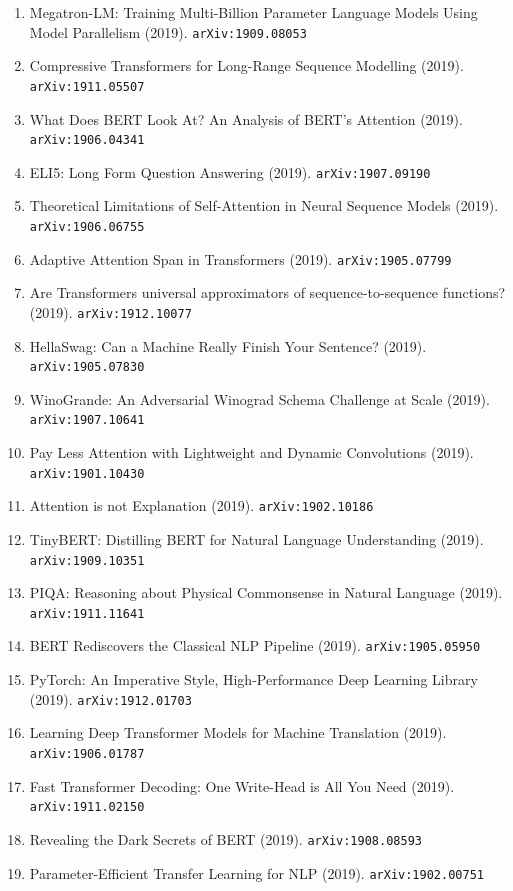 \documentclass[11pt]{article}
\begin{document}
\begin{enumerate}
  \item Megatron-LM: Training Multi-Billion Parameter Language Models Using
  Model Parallelism (2019). \texttt{arXiv:1909.08053}
  \item Compressive Transformers for Long-Range Sequence Modelling (2019). \texttt{arXiv:1911.05507}
  \item What Does BERT Look At? An Analysis of BERT's Attention (2019). \texttt{arXiv:1906.04341}
  \item ELI5: Long Form Question Answering (2019). \texttt{arXiv:1907.09190}
  \item Theoretical Limitations of Self-Attention in Neural Sequence Models (2019). \texttt{arXiv:1906.06755}
  \item Adaptive Attention Span in Transformers (2019). \texttt{arXiv:1905.07799}
  \item Are Transformers universal approximators of sequence-to-sequence
  functions? (2019). \texttt{arXiv:1912.10077}
  \item HellaSwag: Can a Machine Really Finish Your Sentence? (2019). \texttt{arXiv:1905.07830}
  \item WinoGrande: An Adversarial Winograd Schema Challenge at Scale (2019). \texttt{arXiv:1907.10641}
  \item Pay Less Attention with Lightweight and Dynamic Convolutions (2019). \texttt{arXiv:1901.10430}
  \item Attention is not Explanation (2019). \texttt{arXiv:1902.10186}
  \item TinyBERT: Distilling BERT for Natural Language Understanding (2019). \texttt{arXiv:1909.10351}
  \item PIQA: Reasoning about Physical Commonsense in Natural Language (2019). \texttt{arXiv:1911.11641}
  \item BERT Rediscovers the Classical NLP Pipeline (2019). \texttt{arXiv:1905.05950}
  \item PyTorch: An Imperative Style, High-Performance Deep Learning Library (2019). \texttt{arXiv:1912.01703}
  \item Learning Deep Transformer Models for Machine Translation (2019). \texttt{arXiv:1906.01787}
  \item Fast Transformer Decoding: One Write-Head is All You Need (2019). \texttt{arXiv:1911.02150}
  \item Revealing the Dark Secrets of BERT (2019). \texttt{arXiv:1908.08593}
  \item Parameter-Efficient Transfer Learning for NLP (2019). \texttt{arXiv:1902.00751}

\end{enumerate}
\end{document}
